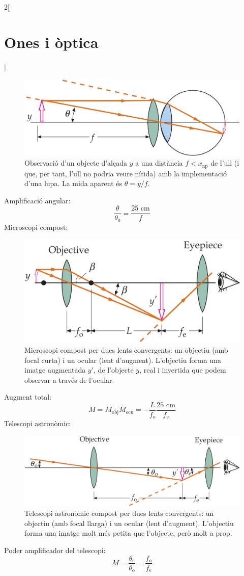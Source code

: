 \documentclass[class=article,10pt,crop=false]{standalone}
\begin{document}
\begin{multicols}{2}[\section{Ones i òptica}]
\begin{figure}
    \includegraphics[width=\linewidth]{Physics/1st/Ones_i_optica/Imatges/lup.jpg} 
    \caption{Observació d'un objecte d'alçada $y$ a una distància $f<x_{\text{np}}$ de l'ull (i que, per tant, l'ull no podria veure nítida) amb la implementació d'una lupa. La mida aparent és $\theta=y/f$.}   
\end{figure}
Amplificació angular: $$\frac{\theta}{\theta_0}=\frac{25\text{ cm}}{f}$$
Microscopi compost:\newline
\begin{figure}
    \includegraphics[width=\linewidth]{Physics/1st/Ones_i_optica/Imatges/micro.jpg} 
    \caption{Microscopi compost per dues lents convergents: un objectiu (amb focal curta) i un ocular (lent d'augment). L'objectiu forma una imatge augmentada $y'$, de l'objecte $y$, real i invertida que podem observar a través de l'ocular.}
\end{figure}
Augment total: $$M=M_{\text{obj}}M_{\text{ocu}}=-\frac{L}{f_{\text{o}}}\frac{25\text{ cm}}{f_{\text{e}}}$$
Telescopi astronòmic:\newline
\begin{figure}
    \includegraphics[width=\linewidth]{Physics/1st/Ones_i_optica/Imatges/tel.jpg} 
    \caption{Telescopi astronòmic compost per dues lents convergents: un objectiu (amb focal llarga) i un ocular (lent d'augment). L'objectiu forma una imatge molt més petita que l'objecte, però molt a prop.}
\end{figure}
Poder amplificador del telescopi: $$M=\frac{\theta_\text{e}}{\theta_\text{o}}=\frac{f_{\text{o}}}{f_{\text{e}}}$$

\end{multicols}
\end{document}
